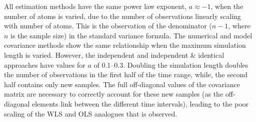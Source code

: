 \documentclass[reprint,superscriptaddress,nobibnotes,amsmath,amssymb,aps,prx,hidelinks]{revtex4-2}
\begin{document}
All estimation methods have the same power law exponent, $a\approx-1$, when the number of atoms is varied, due to the number of observations linearly scaling with number of atoms. 
This is the observation of the denominator ($n - 1$, where $n$ is the sample size) in the standard variance formula. 
The numerical and model covariance methods show the same relationship when the maximum simulation length is varied.
However, the independent and independent \& identical approaches have values for $a$ of \numrange{0.1}{0.3}.
Doubling the simulation length doubles the number of observations in the first half of the time range, while, the second half contains only new samples.
The full off-diagonal values of the covariance matrix are necessary to correctly account for these new samples (as the off-diagonal elements link between the different time intervals), leading to the poor scaling of the WLS and OLS analogues that is observed. 
%
%
%
\end{document}
